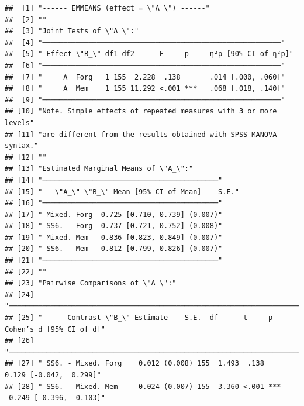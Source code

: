 \documentclass[
  man]{apa6}
\begin{document}
\begin{verbatim}
##  [1] "------ EMMEANS (effect = \"A_\") ------"                                            
##  [2] ""                                                                                   
##  [3] "Joint Tests of \"A_\":"                                                             
##  [4] "─────────────────────────────────────────────────────────"                          
##  [5] " Effect \"B_\" df1 df2      F     p     η²p [90% CI of η²p]"                        
##  [6] "─────────────────────────────────────────────────────────"                          
##  [7] "     A_ Forg   1 155  2.228  .138       .014 [.000, .060]"                          
##  [8] "     A_ Mem    1 155 11.292 <.001 ***   .068 [.018, .140]"                          
##  [9] "─────────────────────────────────────────────────────────"                          
## [10] "Note. Simple effects of repeated measures with 3 or more levels"                    
## [11] "are different from the results obtained with SPSS MANOVA syntax."                   
## [12] ""                                                                                   
## [13] "Estimated Marginal Means of \"A_\":"                                                
## [14] "──────────────────────────────────────────"                                         
## [15] "   \"A_\" \"B_\" Mean [95% CI of Mean]    S.E."                                     
## [16] "──────────────────────────────────────────"                                         
## [17] " Mixed. Forg  0.725 [0.710, 0.739] (0.007)"                                         
## [18] " SS6.   Forg  0.737 [0.721, 0.752] (0.008)"                                         
## [19] " Mixed. Mem   0.836 [0.823, 0.849] (0.007)"                                         
## [20] " SS6.   Mem   0.812 [0.799, 0.826] (0.007)"                                         
## [21] "──────────────────────────────────────────"                                         
## [22] ""                                                                                   
## [23] "Pairwise Comparisons of \"A_\":"                                                    
## [24] "─────────────────────────────────────────────────────────────────────────────────"  
## [25] "      Contrast \"B_\" Estimate    S.E.  df      t     p     Cohen’s d [95% CI of d]"
## [26] "─────────────────────────────────────────────────────────────────────────────────"  
## [27] " SS6. - Mixed. Forg    0.012 (0.008) 155  1.493  .138      0.129 [-0.042,  0.299]"  
## [28] " SS6. - Mixed. Mem    -0.024 (0.007) 155 -3.360 <.001 *** -0.249 [-0.396, -0.103]"  

\end{verbatim}
\end{document}
